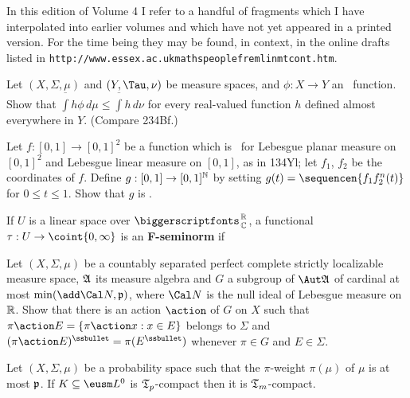      
\def\chaptername{Appendix}
\def\sectionname{`Later editions only'}
     

In this edition of Volume 4 I refer to a handful of fragments which I have
interpolated into earlier
volumes and which have not yet appeared in a printed version.
For the time being they may be found, in context, in the online
drafts listed in
{\tt http://www.essex.ac.uk{\bsp}maths{\bsp}people{\bsp}fremlin{\bsp}mtcont.htm}.

Let $(X,\Sigma,\mu)$ and $(Y,\Tau,\nu)$ be 
measure spaces, and $\phi:X\to Y$ an \imp\ function.   Show that
$\overline{\int}h\phi\,d\mu\le\overline{\int}h\,d\nu$ for every
real-valued function $h$ defined almost everywhere in $Y$.
(Compare 234Bf.)

Let $f:[0,1]\to[0,1]^2$ be a function
which is \imp\ for Lebesgue planar measure on $[0,1]^2$ and
Lebesgue linear measure on $[0,1]$, as in 134Yl;  let $f_1$, $f_2$ be the
coordinates of $f$.   Define $g:[0,1]\to[0,1]^{\Bbb N}$ by setting
$g(t)=\sequencen{f_1f_2^n(t)}$ for $0\le t\le 1$.   Show that $g$ is
\imp.   

 If $U$ is a linear space over $\RoverC$, a
functional $\tau:U\to\coint{0,\infty}$ is an {\bf F-seminorm} if


Let $(X,\Sigma,\mu)$ be a countably separated
perfect complete strictly localizable measure space,
$\frak A$ its measure algebra and $G$ a subgroup of $\Aut\frak A$ of
cardinal at most $\min(\add\Cal N,\frak p)$, where $\Cal N$ is the
null ideal of Lebesgue measure on $\Bbb R$.   Show that there is an action
$\action$ of $G$ on $X$ such that
$\pi\action E=\{\pi\action x:x\in E\}$ belongs to $\Sigma$ and
$(\pi\action E)^{\ssbullet}=\pi(E^{\ssbullet})$ whenever
$\pi\in G$ and $E\in\Sigma$.   

 Let $(X,\Sigma,\mu)$ be a probability space
such that the $\pi$-weight $\pi(\mu)$ of $\mu$ is at most $\frak p$.   If
$K\subseteq\eusm L^0$ is $\frak T_p$-compact then it is
$\frak T_m$-compact.

\discrpage   
          
     

